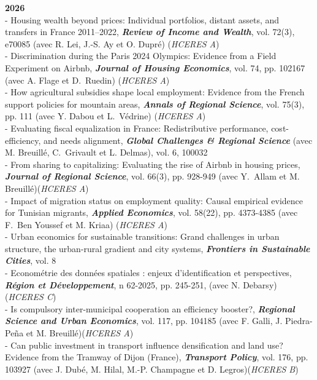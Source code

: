 \documentclass[a4paper,12pt]{article}
\begin{document}
\noindent \textbf{2026}  \smallskip \\
- Housing wealth beyond prices: Individual portfolios, distant assets, and transfers in France 2011–2022, \textit{\textbf{Review of Income and Wealth}}, vol. 72(3), e70085 (avec R. Lei, J.-S. Ay et O. Dupré) (\textit{HCERES A}) \\
- Discrimination during the Paris 2024 Olympics: Evidence from a Field Experiment on Airbnb, \textit{\textbf{Journal of Housing Economics}}, vol. 74, pp. 102167 (avec A. Flage et D.~Ruedin) (\textit{HCERES A})\\
- How agricultural subsidies shape local employment: Evidence from the French support policies for mountain areas, \textit{\textbf{Annals of Regional Science}}, vol. 75(3), pp. 111  (avec Y. Dabou et L.~Védrine) (\textit{HCERES A}) \\
- Evaluating fiscal equalization in France: Redistributive performance, cost-efficiency, and needs alignment, \textit{\textbf{Global Challenges \& Regional Science}} (avec M. Breuillé, C.~Grivault et L. Delmas), vol. 6, 100032\\
- From sharing to capitalizing: Evaluating the rise of Airbnb in housing prices, \textit{\textbf{Journal of Regional Science}}, vol. 66(3), pp. 928-949 (avec Y.~Allam et M. Breuillé)(\textit{HCERES A}) \\
- Impact of migration status on employment quality: Causal empirical evidence for Tunisian migrants, \textit{\textbf{Applied Economics}}, vol. 58(22), pp. 4373-4385 (avec F.~Ben Youssef et M. Kriaa) (\textit{HCERES A}) \\
- Urban economics for sustainable transitions: Grand challenges in urban structure, the urban-rural gradient and city systems, \textit{\textbf{Frontiers in Sustainable Cities}}, vol. 8 \\
- Econométrie des données spatiales : enjeux d'identification et perspectives, \textit{\textbf{Région et Développement}}, n 62-2025, pp. 245-251, (avec N. Debarsy) (\textit{HCERES C}) \\
- Is compulsory inter-municipal cooperation an efficiency booster?, \textit{\textbf{Regional Science and Urban Economics}}, vol. 117, pp. 104185 (avec F. Galli, J. Piedra-Peña et M. Breuillé)(\textit{HCERES A}) \\
- Can public investment in transport influence densification and land use? Evidence from the Tramway of Dijon (France), \textit{\textbf{Transport Policy}}, vol. 176, pp. 103927 (avec J. Dubé, M. Hilal, M.-P. Champagne et D. Legros)(\textit{HCERES B}) \\
\end{document}
